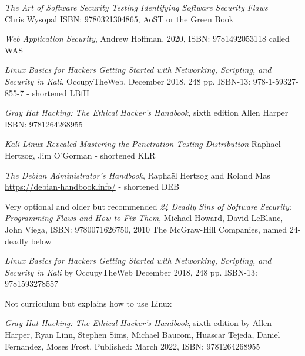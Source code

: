 \documentclass[Screen16to9,17pt]{foils}
\begin{document}


\emph{The Art of Software Security Testing Identifying Software Security Flaws}\\
Chris Wysopal ISBN: 9780321304865, AoST or the Green Book


\emph{Web Application Security}, Andrew Hoffman, 2020, ISBN: 9781492053118 called WAS


 \begin{list2}
 \item \emph{Linux Basics for Hackers Getting Started with Networking, Scripting, and Security in Kali}. OccupyTheWeb, December 2018, 248 pp. ISBN-13: 978-1-59327-855-7 - shortened LBfH
\item \emph{Gray Hat Hacking: The Ethical Hacker's Handbook}, sixth edition Allen Harper ISBN: 9781264268955
 \item \emph{Kali Linux Revealed  Mastering the Penetration Testing Distribution}
 Raphael Hertzog, Jim O'Gorman - shortened KLR
 \item \emph{The Debian Administrator’s Handbook}, Raphaël Hertzog and Roland Mas\\
 \url{https://debian-handbook.info/} - shortened DEB
 \vskip 1cm
 \item Very optional and older but recommended \emph{24 Deadly Sins of Software Security: Programming Flaws and How to Fix Them}, Michael Howard, David LeBlanc, John Viega, ISBN: 9780071626750, 2010 The McGraw-Hill Companies, named 24-deadly below
 \end{list2}



\emph{Linux Basics for Hackers
Getting Started with Networking, Scripting, and Security in Kali}
by OccupyTheWeb
December 2018, 248 pp.
ISBN-13:
9781593278557

Not curriculum but explains how to use Linux



\emph{Gray Hat Hacking: The Ethical Hacker's Handbook}, sixth edition
by Allen Harper, Ryan Linn, Stephen Sims, Michael Baucom, Huascar Tejeda, Daniel Fernandez, Moses Frost, Published: March 2022, ISBN: 9781264268955
\end{document}
